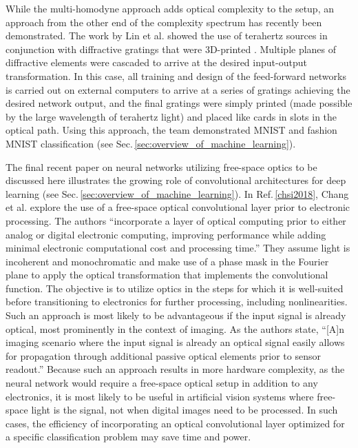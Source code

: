 While the multi-homodyne approach adds optical complexity to the setup, an approach from the other end of the complexity spectrum has recently been demonstrated. The work by Lin et al. showed the use of terahertz sources in conjunction with diffractive gratings that were 3D-printed \cite{liri2018}. Multiple planes of diffractive elements were cascaded to arrive at the desired input-output transformation. In this case, all training and design of the feed-forward networks is carried out on external computers to arrive at a series of gratings achieving the desired network output, and the final gratings were simply printed (made possible by the large wavelength of terahertz light) and placed like cards in slots in the optical path. Using this approach, the team demonstrated MNIST and fashion MNIST classification (see Sec.\,\ref{sec:overview_of_machine_learning}).

The final recent paper on neural networks utilizing free-space optics to be discussed here illustrates the growing role of convolutional architectures for deep learning (see Sec.\,\ref{sec:overview_of_machine_learning}). In Ref.\,\ref{chsi2018}, Chang et al. explore the use of a free-space optical convolutional layer prior to electronic processing. The authors ``incorporate a layer of optical computing prior to either analog or digital electronic computing, improving performance while adding minimal electronic computational cost and processing time.'' They assume light is incoherent and monochromatic and make use of a phase mask in the Fourier plane to apply the optical transformation that implements the convolutional function. The objective is to utilize optics in the steps for which it is well-suited before transitioning to electronics for further processing, including nonlinearities. Such an approach is most likely to be advantageous if the input signal is already optical, most prominently in the context of imaging. As the authors state, ``[A]n imaging scenario where the input signal is already an optical signal easily allows for propagation through additional passive optical elements prior to sensor readout.'' Because such an approach results in more hardware complexity, as the neural network would require a free-space optical setup in addition to any electronics, it is most likely to be useful in artificial vision systems where free-space light is the signal, not when digital images need to be processed. In such cases, the efficiency of incorporating an optical convolutional layer optimized for a specific classification problem may save time and power.

